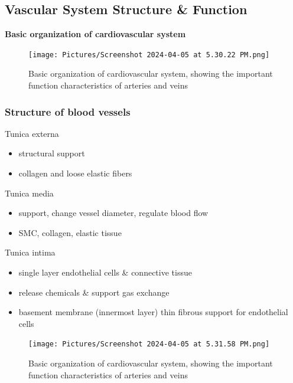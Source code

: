 \documentclass[11pt,fleqn]{book}
\begin{document}
\subsection{Vascular System Structure \& Function}
\textbf{Basic organization of cardiovascular system}
\begin{figure}[h!]
\begin{center}
    \texttt{[image: Pictures/Screenshot 2024-04-05 at 5.30.22 PM.png]}
\end{center}
    \caption{Basic organization of cardiovascular system, showing the important function characteristics of arteries and veins}
\end{figure}
\subsubsection{Structure of blood vessels}
\begin{descriptions}
    \item[Tunica externa]\begin{descriptions}
    \end{descriptions} 
    \begin{itemize}
        \item structural support
        \item collagen and loose elastic fibers
    \end{itemize}
    \item[Tunica media]\begin{descriptions}
    \end{descriptions} 
    \begin{itemize}
        \item support, change vessel diameter, regulate blood flow
        \item SMC, collagen, elastic tissue
    \end{itemize}
    \item[Tunica intima]\begin{descriptions}
    \end{descriptions} 
    \begin{itemize}
        \item single layer endothelial cells \& connective tissue
        \item release chemicals \& support gas exchange
        \item basement membrane (innermost layer) thin fibrous support for endothelial cells
    \end{itemize}
\end{descriptions}
\begin{figure}[h!]
\begin{center}
    \texttt{[image: Pictures/Screenshot 2024-04-05 at 5.31.58 PM.png]}
\end{center}
    \caption{Basic organization of cardiovascular system, showing the important function characteristics of arteries and veins}
\end{figure}
\end{document}
